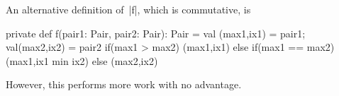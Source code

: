 \begin{answerS}
An alternative definition of~|f|, which is commutative, is
%
\begin{scala}
  private def f(pair1: Pair, pair2: Pair): Pair = {
    val (max1,ix1) = pair1; val(max2,ix2) = pair2
    if(max1 > max2) (max1,ix1) 
    else if(max1 == max2) (max1,ix1 min ix2) 
    else (max2,ix2)
  }
\end{scala}
%
However, this performs more work with no advantage.
\end{answerS}
